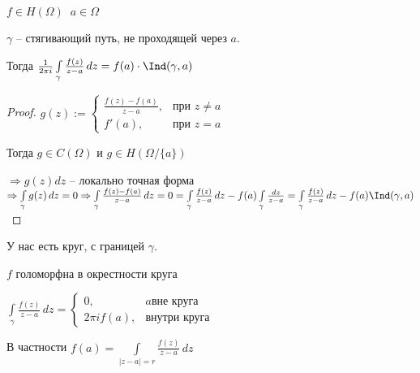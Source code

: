 \begin{theorem}\thmslashn
	
	$f\in H(\Omega) \;\; a\in \Omega$
	
	$\gamma$ -- стягивающий путь, не проходящей через $a$. 
	
	Тогда $\frac{1}{2\pi i}\int\limits_\gamma \frac{f(z)}{z-a}\,dz = f(a)\cdot \Ind(\gamma, a)$
	
\end{theorem}

\begin{proof}\thmslashn
	
	$
	g(z) :=
	\begin{cases}
		\frac{f(z) - f(a)}{z-a}, & \text{при } z \not = a \\
		f'(a), & \text{при } z = a
	\end{cases}
	$
	
	Тогда $g \in C(\Omega)$ и $g\in H(\Omega/\{a\})$
	
	$\Rightarrow g(z)dz$ -- локально точная форма $\Rightarrow \int\limits_\gamma g(z)\,dz = 0 \Rightarrow \int\limits_\gamma \frac{f(z) - f(a)}{z-a}\,dz = 0 = \int\limits_\gamma \frac{f(z)}{z-a}\,dz - f(a) \int\limits_\gamma \frac{dz}{z-a} = \int\limits_\gamma \frac{f(z)}{z-a}\,dz - f(a) \Ind(\gamma, a)$
\end{proof}

\begin{example}\thmslashn
	
	У нас есть круг, с границей $\gamma$. 
	
	$f$ голоморфна в окрестности круга
	
	$\int\limits_\gamma \frac{f(z)}{z-a}\,dz = 
	\begin{cases}
	0, & a \text{вне круга}\\
	2\pi i f(a), & \text{внутри круга}
	\end{cases}$
	
	В частности $f(a) = \int\limits_{|z-a| = r} \frac{f(z)}{z-a}\,dz$
\end{example}